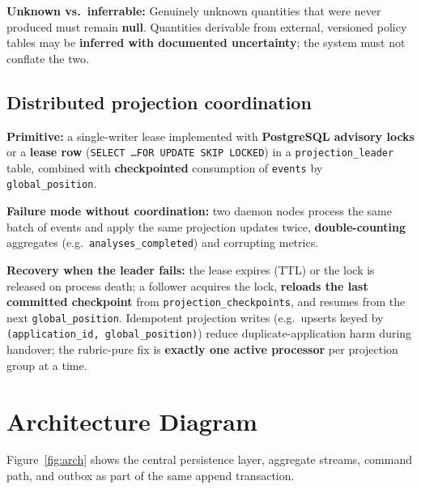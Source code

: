 \documentclass[11pt,a4paper]{article}
\begin{document}
\textbf{Unknown vs.\ inferrable:} Genuinely unknown quantities that were never produced must remain \textbf{null}. Quantities derivable from external, versioned policy tables may be \textbf{inferred with documented uncertainty}; the system must not conflate the two.

\subsection{Distributed projection coordination}

\textbf{Primitive:} a single-writer lease implemented with \textbf{PostgreSQL advisory locks} or a \textbf{lease row} (\texttt{SELECT \ldots FOR UPDATE SKIP LOCKED}) in a \texttt{projection\_leader} table, combined with \textbf{checkpointed} consumption of \texttt{events} by \texttt{global\_position}.

\textbf{Failure mode without coordination:} two daemon nodes process the same batch of events and apply the same projection updates twice, \textbf{double-counting} aggregates (e.g.\ \texttt{analyses\_completed}) and corrupting metrics.

\textbf{Recovery when the leader fails:} the lease expires (TTL) or the lock is released on process death; a follower acquires the lock, \textbf{reloads the last committed checkpoint} from \texttt{projection\_checkpoints}, and resumes from the next \texttt{global\_position}. Idempotent projection writes (e.g.\ upserts keyed by \texttt{(application\_id, global\_position)}) reduce duplicate-application harm during handover; the rubric-pure fix is \textbf{exactly one active processor} per projection group at a time.

\section{Architecture Diagram}

Figure~\ref{fig:arch} shows the central persistence layer, aggregate streams, command path, and outbox as part of the same append transaction.
\end{document}
